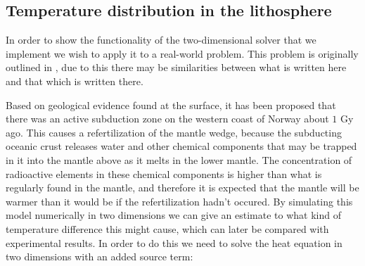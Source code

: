 \documentclass[reprint,english,notitlepage]{revtex4-1}  %
\newcommand\numberthis{\addtocounter{equation}{1}\tag{\theequation}}
\begin{document}





\subsection{Temperature distribution in the lithosphere} \label{sec:formalism_temp_dist_lithosphere}

In order to show the functionality of the two-dimensional solver that we implement we wish to apply it to a real-world problem. This problem is originally outlined in \cite[p.~4-5]{Hjorth-Jensen2020-p5}, due to this there may be similarities between what is written here and that which is written there. 

Based on geological evidence found at the surface, it has been proposed that there was an active subduction zone on the western coast of Norway about $1$ Gy ago. This causes a refertilization of the mantle wedge, because the subducting oceanic crust releases water and other chemical components that may be trapped in it into the mantle above as it melts in the lower mantle. The concentration of radioactive elements in these chemical components is higher than what is regularly found in the mantle, and therefore it is expected that the mantle will be warmer than it would be if the refertilization hadn't occured. By simulating this model numerically in two dimensions we can give an estimate to what kind of temperature difference this might cause, which can later be compared with experimental results. In order to do this we need to solve the heat equation in two dimensions with an added source term:
\end{document}

